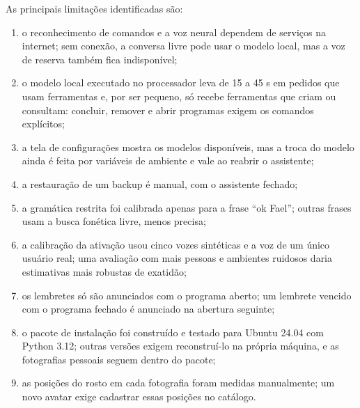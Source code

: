 As principais limitações identificadas são:
\begin{enumerate}[label=\alph*)]
  \item o reconhecimento de comandos e a voz neural dependem de serviços na internet; sem conexão, a
        conversa livre pode usar o modelo local, mas a voz de reserva também fica indisponível;
  \item o modelo local executado no processador leva de 15 a 45 s em pedidos que usam ferramentas e,
        por ser pequeno, só recebe ferramentas que criam ou consultam: concluir, remover e abrir
        programas exigem os comandos explícitos;
  \item a tela de configurações mostra os modelos disponíveis, mas a troca do modelo ainda é feita por
        variáveis de ambiente e vale ao reabrir o assistente;
  \item a restauração de um backup é manual, com o assistente fechado;
  \item a gramática restrita foi calibrada apenas para a frase “ok Fael”; outras frases usam a busca
        fonética livre, menos precisa;
  \item a calibração da ativação usou cinco vozes sintéticas e a voz de um único usuário real; uma
        avaliação com mais pessoas e ambientes ruidosos daria estimativas mais robustas de exatidão;
  \item os lembretes só são anunciados com o programa aberto; um lembrete vencido com o programa fechado
        é anunciado na abertura seguinte;
  \item o pacote de instalação foi construído e testado para Ubuntu 24.04 com Python 3.12; outras
        versões exigem reconstruí-lo na própria máquina, e as fotografias pessoais seguem dentro do
        pacote;
  \item as posições do rosto em cada fotografia foram medidas manualmente; um novo avatar exige
        cadastrar essas posições no catálogo.
\end{enumerate}
